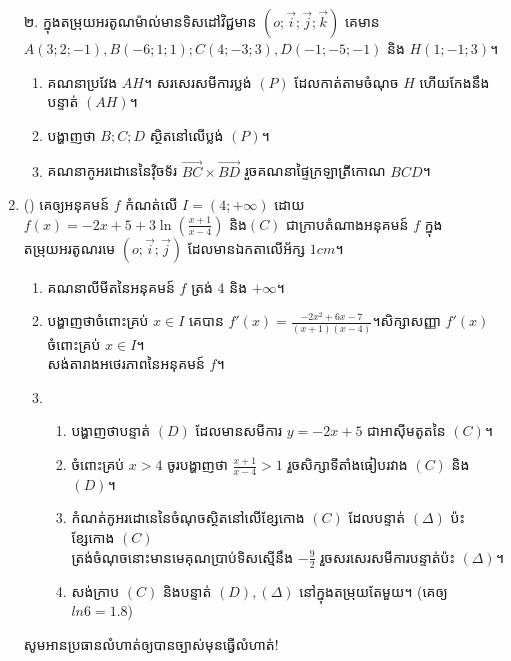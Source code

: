 \documentclass{officialexam}
\begin{document}
\begin{enumerate}[I]
	{\color{khtug}២.} ក្នុងតម្រុយអរតូណម៉ាល់មានទិសដៅវិជ្ជមាន $\left(o;\vec{i};\vec{j};\vec{k}\right)$ គេមាន $A\left(3;2;-1\right),B\left(-6;1;1\right);C\left(4;-3;3\right),D\left(-1;-5;-1\right)$ និង $H\left(1;-1;3\right)$។
	\begin{enumerate}[k]
		\item គណនាប្រវែង $AH$។ សរសេរសមីការប្លង់ $\left(P\right)$ ដែលកាត់តាមចំណុច $H$ ហើយកែងនឹងបន្ទាត់ $\left(AH\right)$។
		\item បង្ហាញថា $B;C;D$ ស្ថិតនៅលើប្លង់ $\left(P\right)$។
		\item គណនាកូអរដោនេនៃវុិចទ័រ $\overrightarrow{BC}\times\overrightarrow{BD}$ រួចគណនាផ្ទៃក្រឡាត្រីកោណ $BCD$។
	\end{enumerate}
	\item {\color{khtug}()} គេឲ្យអនុគមន៍ $f$ កំណត់លើ $I=\left(4;+\infty\right)$ ដោយ $f(x)=-2x+5+3\ln\left(\frac{x+1}{x-4}\right)$ និង$\left(C\right)$ ជាក្រាបតំណាងអនុគមន៍ $f$ ក្នុងតម្រុយអរតូណរមេ $\left(o;\vec{i};\vec{j}\right)$ ដែលមានឯកតាលើអ័ក្ស $1cm$។
	\begin{enumerate}[m]
		\item គណនាលីមីតនៃអនុគមន៍ $f$ ត្រង់ $4$ និង $+\infty$។
		\item បង្ហាញថាចំពោះគ្រប់ $x\in I$ គេបាន $f'(x)=\frac{-2x^2+6x-7}{\left(x+1\right)\left(x-4\right)}$។​សិក្សាសញ្ញា $f'(x)$ ចំពោះគ្រប់ $x\in I$។\\ សង់តារាងអថេរភាពនៃអនុគមន៍ $f$។
		\item \begin{enumerate}[k]
			\item បង្ហាញថាបន្ទាត់ $(D)$ ដែលមានសមីការ $y=-2x+5$ ជាអាសុីមតូតនៃ $\left(C\right)$។
			\item ចំពោះគ្រប់ $x>4$ ចូរបង្ហាញថា $\frac{x+1}{x-4}>1$ រួចសិក្សាទីតាំងធៀបរវាង $(C)$ និង $(D)$។
			\item កំណត់កូអរដោនេនៃចំណុចស្ថិតនៅលើខ្សែកោង $(C)$ ដែលបន្ទាត់ $\left(\Delta\right)$ ប៉ះខ្សែកោង $(C)$\\ ត្រង់ចំណុចនោះមានមេគុណប្រាប់ទិសស្មើនឹង $-\frac{9}{2}$ រួចសរសេរសមីការបន្ទាត់ប៉ះ $\left(\Delta\right)$។
			\item សង់ក្រាប $(C)$ និងបន្ទាត់ $(D),\left(\Delta\right)$ នៅក្នុងតម្រុយតែមួយ។ (គេឲ្យ $ln6=1.8$) 
		\end{enumerate}
	\end{enumerate}
	\begin{center}
		\sffamily\color{blue}
		សូមអានប្រធានលំហាត់ឲ្យបានច្បាស់មុនធ្វើលំហាត់!
	\end{center}
\end{enumerate}
\end{document}
